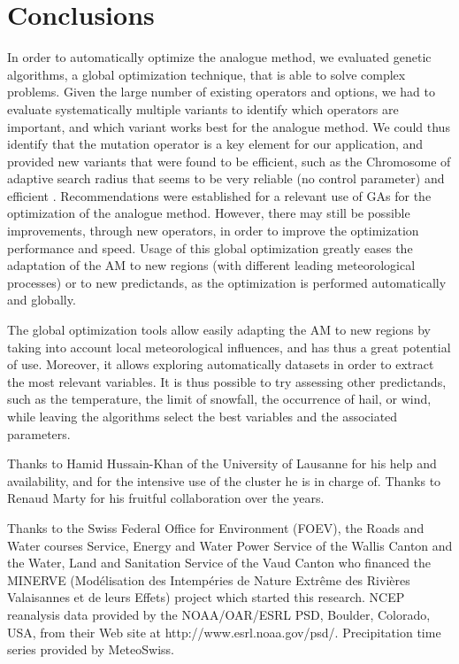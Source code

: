 \documentclass[twocol]{ametsoc}
\begin{document}
\section{Conclusions}


In order to automatically optimize the analogue method, we evaluated genetic algorithms, a global optimization technique, that is able to solve complex problems. Given the large number of existing operators and options, we had to evaluate systematically multiple variants to identify which operators are important, and which variant works best for the analogue method. We could thus identify that the mutation operator is a key element for our application, and provided new variants that were found to be efficient, such as the Chromosome of adaptive search radius that seems to be very reliable (no control parameter) and efficient . Recommendations were established for a relevant use of GAs for the optimization of the analogue method. However, there may still be possible improvements, through new operators, in order to improve the optimization performance and speed. Usage of this global optimization greatly eases the adaptation of the AM to new regions (with different leading meteorological processes) or to new predictands, as the optimization is performed automatically and globally.





The global optimization tools allow easily adapting the AM to new regions by taking into account local meteorological influences, and has thus a great potential of use. Moreover, it allows exploring automatically datasets in order to extract the most relevant variables. It is thus possible to try assessing other predictands, such as the temperature, the limit of snowfall, the occurrence of hail, or wind, while leaving the algorithms select the best variables and the associated parameters.


%
\acknowledgments
Thanks to Hamid Hussain-Khan of the University of Lausanne for his help and availability, and for the intensive use of the cluster he is in charge of. Thanks to Renaud Marty for his fruitful collaboration over the years.

Thanks to the Swiss Federal Office for Environment (FOEV), the Roads and Water courses Service, Energy and Water Power Service of the Wallis Canton and the Water, Land and Sanitation Service of the Vaud Canton who financed the MINERVE (Mod\'{e}lisation des Intemp\'{e}ries de Nature Extr\^{e}me des Rivi\`{e}res Valaisannes et de leurs Effets) project which started this research. NCEP reanalysis data provided by the NOAA/OAR/ESRL PSD, Boulder, Colorado, USA, from their Web site at http://www.esrl.noaa.gov/psd/. Precipitation time series provided by MeteoSwiss. 
\end{document}

